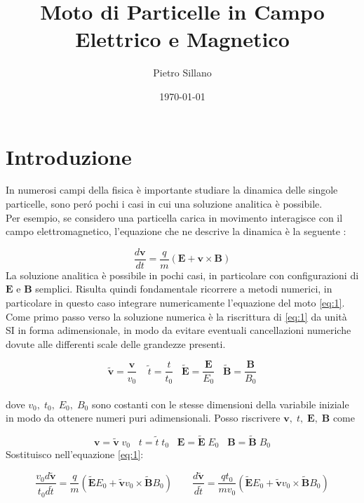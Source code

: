 \documentclass[11pt]{article}
\title{Moto di Particelle in Campo Elettrico e Magnetico}
\author{Pietro Sillano}
\date{\today}
\begin{document}
\maketitle
\tableofcontents

\section{Introduzione}
In numerosi campi della fisica è importante studiare la dinamica delle singole particelle, sono peró pochi i casi in cui una soluzione analitica è possibile. \\
Per esempio, se considero una particella carica in movimento interagisce con il campo elettromagnetico, l'equazione che ne descrive la dinamica è la seguente :

\begin{equation} \label{eq:1}
\frac{d\mathbf{v}}{dt}=\frac{q}{m}(\mathbf{E}+\mathbf{v}\times\mathbf{B}) 
\end{equation}
La soluzione analitica è possibile in pochi casi, in particolare con configurazioni di $\mathbf{E}$ e $\mathbf{B}$ semplici. Risulta quindi fondamentale ricorrere a metodi numerici, in particolare in questo caso integrare numericamente l'equazione del moto \eqref{eq:1}.\\
Come primo passo verso la soluzione numerica è la riscrittura di \eqref{eq:1} da unit\`a SI in forma adimensionale, in modo da evitare eventuali cancellazioni numeriche dovute alle differenti scale delle grandezze presenti.


\begin{equation}\mathbf{\mathbf{\tilde{v}}}=\frac{\mathbf{v}}{v_0} \;\;\;\;\tilde{t}=\frac{t}{t_0} \;\; \; \tilde{\mathbf{E}}=\frac{\mathbf{E}}{E_0}  \; \;\;\tilde{\mathbf{B}}=\frac{\mathbf{B}}{B_0}\end{equation} \\
dove $v_0,\;t_0,\; E_0,\; B_0$ sono costanti con le stesse dimensioni della variabile iniziale in modo da ottenere numeri puri adimensionali.
Posso riscrivere $\mathbf{v},\;t,\;\mathbf{E},\;\mathbf{B}$ come 

\begin{equation} \mathbf{v}=\tilde{\mathbf{v}}\;v_0 \; \; \; t=\tilde{t}\;t_0 \;\; \; \mathbf{E}=\tilde{\mathbf{E}}\;E_0 \;\; \;\mathbf{B}=\tilde{\mathbf{B}}\;B_0 \end{equation}
Sostituisco nell'equazione \eqref{eq:1}:

\begin{equation}\frac{v_0d\mathbf{\tilde{v}}}{t_0d\tilde{t}}=\frac{q}{m}(\mathbf{\tilde{E}}E_0+\mathbf{\mathbf{\tilde{v}}}v_0\times\mathbf{\tilde{B}}B_0) \quad  \quad \frac{d\mathbf{\tilde{v}}}{d\tilde{t}} =\frac{qt_0}{mv_0}(\mathbf{\tilde{E}}E_0+\mathbf{\tilde{v}}v_0\times\mathbf{\tilde{B}}B_0)\end{equation}
\end{document}
